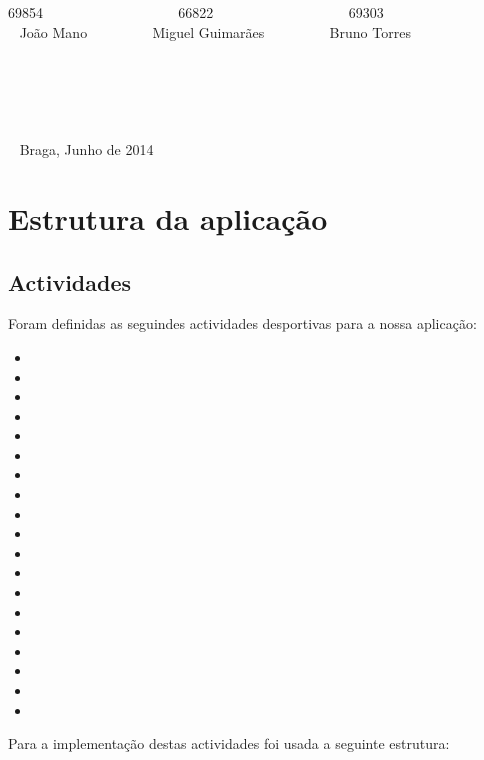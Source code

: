 \documentclass[10pt,notitlepage]{article}
\begin{document}
\begin{titlepage}
\begin{center}
69854 ~~~~~~~~~~~~~~~~~~ 66822 ~~~~~~~~~~~~~~~~~~ 69303   \\~  João Mano ~~~~~~~~ Miguel Guimarães ~~~~~~~~ Bruno Torres  \\~ \\~ \\~ \\~ \\~ \\~ Braga, Junho de 2014
\end{center}
\end{titlepage}




\tableofcontents

\newpage


\section{Estrutura da aplicação}

\subsection{Actividades}
Foram definidas as seguindes actividades desportivas para a nossa aplicação:
\begin{itemize}
\item 
\item
\item
\item
\item
\item
\item
\item
\item
\item
\item 
\item
\item
\item
\item
\item
\item
\item
\item

\end{itemize}

\newpage
Para a implementação destas actividades foi usada a seguinte estrutura:
\end{document}
